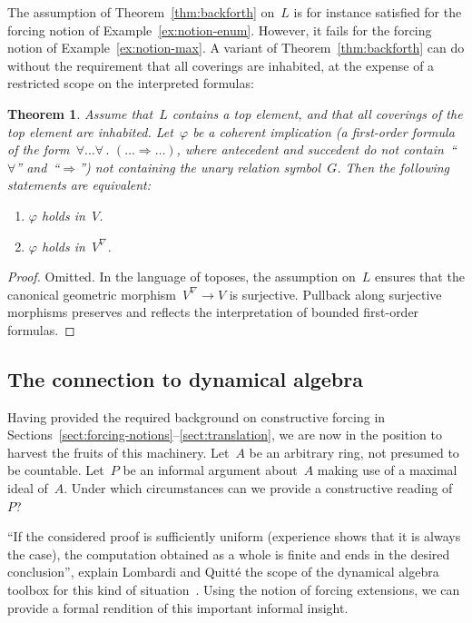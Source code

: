 \documentclass[com,11pt,crcready]{iosart2x}
\theoremstyle{definition}
\theoremstyle{plain}
\newtheorem{theorem}[definition]{Theorem}
\theoremstyle{remark}
\newcommand{\?}{\,{:}\,}
\renewcommand{\_}{\mathpunct{.}\,}
\begin{document}
The assumption of Theorem~\ref{thm:backforth} on~$L$ is for instance satisfied
for the forcing notion of Example~\ref{ex:notion-enum}. However, it fails for
the forcing notion of Example~\ref{ex:notion-max}. A variant of
Theorem~\ref{thm:backforth} can do without the requirement that all coverings
are inhabited, at the expense of a restricted scope on the interpreted
formulas:

\begin{theorem}\label{thm:backforth-weak}Assume that~$L$ contains a top
element, and that all coverings of the top element are inhabited.
Let~$\varphi$ be a coherent implication (a first-order formula of the
form~$\forall\ldots\forall\_(\ldots\Rightarrow\ldots)$, where antecedent and
succedent do not contain~``$\forall$'' and~``${\Rightarrow}$'') not containing
the unary relation symbol~$G$. Then the following statements are equivalent:
\begin{enumerate}
\item[(a)] $\varphi$ holds in~$V$.
\item[(b)] $\varphi$ holds in~$V^\nabla$.
\end{enumerate}
\end{theorem}

\begin{proof}Omitted. In the language of toposes, the assumption on~$L$ ensures
that the canonical geometric morphism~$V^\nabla \to V$ is surjective.
Pullback along surjective morphisms preserves and reflects the interpretation
of bounded first-order formulas.
\end{proof}


\subsection{The connection to dynamical algebra}
\label{sect:dynalg}

Having provided the required background on constructive forcing in
Sections~\ref{sect:forcing-notions}--\ref{sect:translation}, we are now in the
position to harvest the fruits of this machinery. Let~$A$ be an arbitrary ring,
not presumed to be countable. Let~$P$ be an informal argument about~$A$ making
use of a maximal ideal of~$A$. Under which circumstances can we provide a constructive
reading of~$P$?

``If the considered proof is sufficiently uniform (experience shows that it is
always the case), the computation obtained as a whole is finite and ends in the
desired conclusion'', explain Lombardi and Quitté the scope of the
dynamical algebra toolbox for this kind of situation~\cite[Section~XV.6,
p.~876]{lombardi-quitte:constructive-algebra}. Using the notion of forcing
extensions, we can provide a formal rendition of this important informal
insight.
\end{document}
